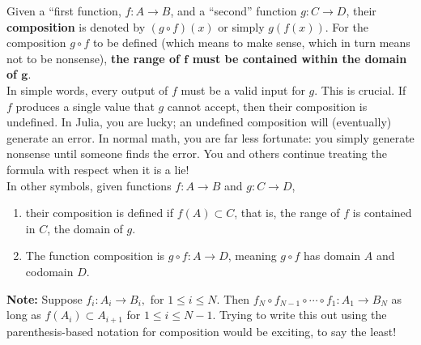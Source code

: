\begin{tcolorbox}[colback=mylightblue, title = {\bf The Composition of Two or More Functions}, breakable]

\begin{definition} Given a ``first function, \( f: A \to B \), and a ``second'' function \( g: C \to D \), their \textbf{composition} is denoted by \( (g \circ f)(x) \) or simply \( g(f(x)) \). For the composition \( g \circ f \) to be defined (which means to make sense, which in turn means not to be nonsense), \textbf{the range of \( \bm{f} \) must be contained within the domain of \( \bm{g} \)}. \\

In simple words, every output of \( f \) must be a valid input for \( g \). This is crucial. If \( f \) produces a single value that \( g \) cannot accept, then their composition is undefined. In Julia, you are lucky; an undefined composition will (eventually) generate an error. In normal math, you are far less fortunate: you simply generate nonsense until someone finds the error. You and others continue treating the formula with respect when it is a lie!  \\

In other symbols, given functions \( f: A \to B \) and \( g: C \to D \), 
\begin{enumerate}
\renewcommand{\labelenumi}{(\alph{enumi})}
\setlength{\itemsep}{.2cm}
    \item their composition is defined if $f(A) \subset C$, that is, the range of $f$ is contained in $C$, the domain of $g$.
    \item The function composition  is \( g \circ f : A \to D\), meaning $g \circ f$ has domain $A$ and codomain $D$.
\end{enumerate}
\end{definition}




\textbf{Note:} Suppose $f_i: A_i \to B_i,$ for $1 \le i \le N$. Then $f_N \circ f_{N-1} \circ \cdots \circ f_1 :A_1 \to B_N$ as long as $f(A_i) \subset A_{i+1}$ for $1 \le i \le N-1$. Trying to write this out using the parenthesis-based notation for composition would be exciting, to say the least! 
\end{tcolorbox}

